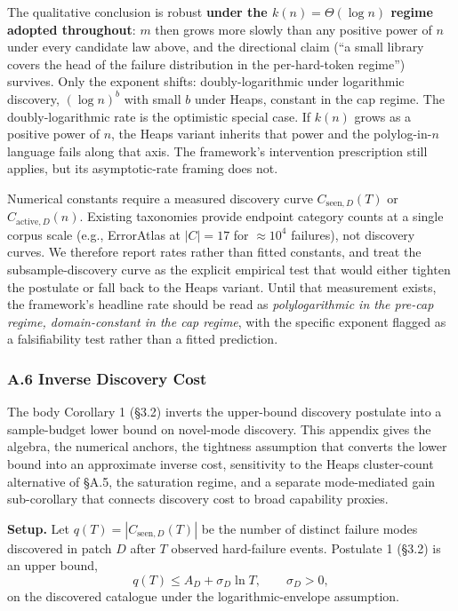 \documentclass[
]{article}
\begin{document}
The qualitative conclusion is robust \textbf{under the
\(k(n) = \Theta(\log n)\) regime adopted throughout}: \(m\) then grows
more slowly than any positive power of \(n\) under every candidate law
above, and the directional claim (``a small library covers the head of
the failure distribution in the per-hard-token regime'') survives. Only
the exponent shifts: doubly-logarithmic under logarithmic discovery,
\((\log n)^b\) with small \(b\) under Heaps, constant in the cap regime.
The doubly-logarithmic rate is the optimistic special case. If \(k(n)\)
grows as a positive power of \(n\), the Heaps variant inherits that
power and the polylog-in-\(n\) language fails along that axis. The
framework's intervention prescription still applies, but its
asymptotic-rate framing does not.

Numerical constants require a measured discovery curve
\(C_{\text{seen},D}(T)\) or \(C_{\text{active},D}(n)\). Existing
taxonomies provide endpoint category counts at a single corpus scale
(e.g., ErrorAtlas at \(|C| = 17\) for \(\approx 10^4\) failures), not
discovery curves. We therefore report rates rather than fitted
constants, and treat the subsample-discovery curve as the explicit
empirical test that would either tighten the postulate or fall back to
the Heaps variant. Until that measurement exists, the framework's
headline rate should be read as \emph{polylogarithmic in the pre-cap
regime, domain-constant in the cap regime}, with the specific exponent
flagged as a falsifiability test rather than a fitted prediction.

\subsubsection{A.6 Inverse Discovery
Cost}\label{a.6-inverse-discovery-cost}

The body Corollary 1 (§3.2) inverts the upper-bound discovery postulate
into a sample-budget lower bound on novel-mode discovery. This appendix
gives the algebra, the numerical anchors, the tightness assumption that
converts the lower bound into an approximate inverse cost, sensitivity
to the Heaps cluster-count alternative of §A.5, the saturation regime,
and a separate mode-mediated gain sub-corollary that connects discovery
cost to broad capability proxies.

\textbf{Setup.} Let \(q(T) = |C_{\text{seen},D}(T)|\) be the number of
distinct failure modes discovered in patch \(D\) after \(T\) observed
hard-failure events. Postulate 1 (§3.2) is an upper bound, \[
q(T) \leq A_D + \sigma_D \ln T, \qquad \sigma_D > 0,
\] on the discovered catalogue under the logarithmic-envelope
assumption.
\end{document}
